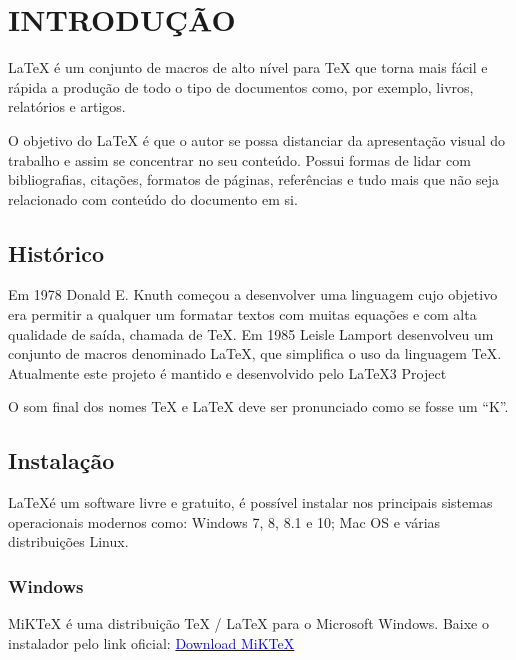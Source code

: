 
\chapter{INTRODUÇÃO}
\label{chap:introducao}

\LaTeX \xspace é um conjunto de macros de alto nível para \TeX \xspace que torna mais fácil e rápida a produção de todo o tipo de documentos como, por exemplo, livros, relatórios e artigos.

O objetivo do \LaTeX \xspace é que o autor se possa distanciar da apresentação visual do trabalho e assim se concentrar no seu conteúdo. Possui formas de lidar com bibliografias, citações, formatos de páginas, referências e tudo mais que não seja relacionado com conteúdo do documento em si.

\section{Histórico}
\label{sec:Histórico}

Em 1978 Donald E. Knuth começou a desenvolver uma linguagem cujo objetivo era permitir a qualquer um formatar textos com muitas equações e com alta qualidade de saída, chamada de \TeX. Em 1985 Leisle Lamport desenvolveu um conjunto de macros denominado \LaTeX \xspace, que simplifica o uso da linguagem \TeX \xspace. Atualmente este projeto é mantido e desenvolvido pelo \LaTeX3 \xspace Project

O som final dos nomes \TeX \xspace e \LaTeX \xspace deve ser pronunciado como se fosse um “K”.

\section{Instalação}
\label{sec:Instalação}

\LaTeX é um software livre e gratuito, é possível instalar nos  principais sistemas operacionais modernos como: Windows 7, 8, 8.1 e 10; Mac OS e várias distribuições Linux.

\subsection{Windows}

MiKTeX é uma distribuição TeX / LaTeX para o Microsoft Windows. Baixe o instalador pelo link oficial: \href{https://miktex.org/download}{\textcolor{blue}{Download MiKTeX}}

